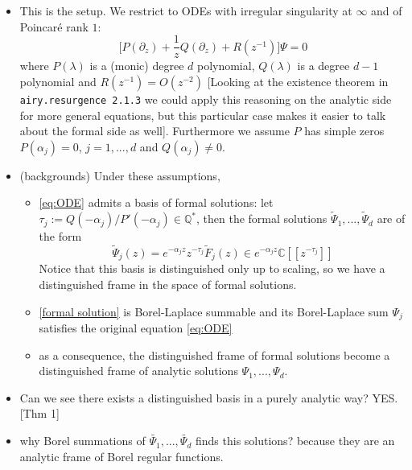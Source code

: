 \documentclass{article}
\newcommand{\C}{\mathbb{C}}
\begin{document}
\begin{itemize}
\begin{itemize}
\item This is the setup. We restrict to ODEs with irregular singularity at $\infty$ and of Poincaré rank $1$: 
\begin{equation}\label{eq:ODE}
\big[ P(\partial_z)+\frac{1}{z}Q(\partial_z)+R(z^{-1})\big]\Psi=0
\end{equation}
where $P(\lambda)$ is a (monic) degree $d$ polynomial, $Q(\lambda)$ is a degree $d-1$ polynomial and $R(z^{-1})=O(z^{-2})$ [Looking at the existence theorem in {\tt airy.resurgence 2.1.3} we could apply this reasoning on the analytic side for more general equations, but this particular case makes it easier to talk about the formal side as well]. Furthermore we assume $P$ has simple zeros $P(\alpha_j)=0$, $j=1,...,d$ and $Q(\alpha_j)\neq 0$. 
\item (backgrounds) Under these assumptions, 
\begin{itemize}
\item \eqref{eq:ODE} admits a basis of formal solutions: let $\tau_j:=Q(-\alpha_j)/P'(-\alpha_j)\in\mathbb{Q}^*$, then the formal solutions $\tilde{\Psi}_1,...,\tilde{\Psi}_d$ are of the form  
\begin{equation}
\label{formal solution}
\tilde{\Psi}_j(z)=e^{-\alpha_j z}z^{-\tau_j}\tilde{F}_j(z)\in e^{-\alpha_j z }\C[\![z^{-\tau_j}]\!]
\end{equation}
Notice that this basis is distinguished only up to scaling, so we have a distinguished frame in the space of formal solutions. 
\item \eqref{formal solution} is Borel-Laplace summable and its Borel-Laplace sum $\Psi_j$ satisfies the original equation \eqref{eq:ODE}
\item as a consequence, the distinguished frame of formal solutions become a distinguished frame of analytic solutions $\Psi_1,...,\Psi_d$.  
\end{itemize}
\item Can we see there exists a distinguished basis in a purely analytic way? YES. [Thm 1]%
\item why Borel summations of $\tilde{\Psi_1},...,\tilde{\Psi_d}$ finds this solutions? because they are an analytic frame of Borel regular functions. 
\begin{itemize}

\end{itemize}
\end{itemize}
\end{itemize}
\end{document}
